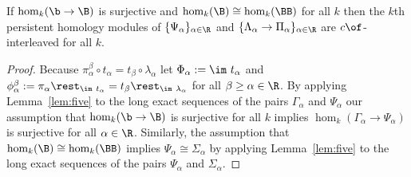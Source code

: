 \begin{lemma}
  If $\hom_k(\b\to\B)$ is surjective and $\hom_k(\B)\cong \hom_k(\BB)$ for all $k$ then the $k$th persistent homology modules of $\{\Psi_\alpha\}_{\alpha\in\R}$ and $\{\Lambda_\alpha\to \Pi_\alpha\}_{\alpha\in\R}$ are $c\of$-interleaved for all $k$.
\end{lemma}
\begin{proof}
  Because $\pi_\alpha^\beta\circ t_\alpha = t_\beta\circ \lambda_\alpha$ let $\Phi_\alpha :=\im~t_\alpha$ and $\phi_\alpha^\beta := \pi_\alpha\rest_{\im~t_\alpha} = t_\beta\rest_{\im~\lambda_\alpha}$ for all $\beta\geq\alpha\in\R$.
  By applying Lemma~\ref{lem:five} to the long exact sequences of the pairs $\Gamma_\alpha$ and $\Psi_\alpha$ our assumption that $\hom_k(\b\to\B)$ is surjective for all $k$ implies $\hom_k(\Gamma_\alpha\to \Psi_\alpha)$ is surjective for all $\alpha\in\R$.
  Similarly, the assumption that $\hom_k(\B)\cong \hom_k(\BB)$ implies $\Psi_\alpha\cong \Sigma_\alpha$ by applying Lemma~\ref{lem:five} to the long exact sequences of the pairs $\Psi_\alpha$ and $\Sigma_\alpha$.


\end{proof}
